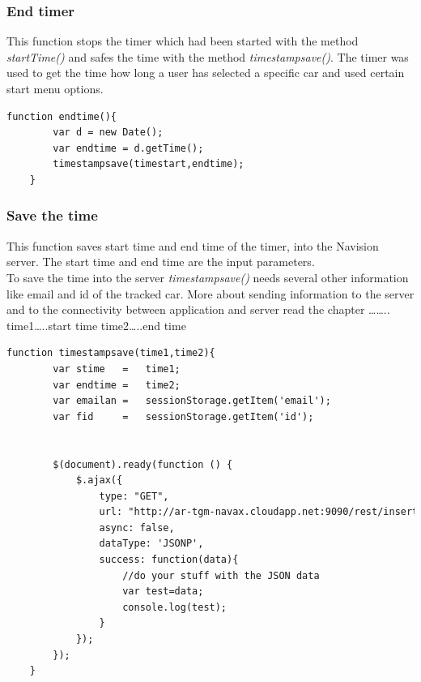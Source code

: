 \subsubsection{End timer}
This function stops the timer which had been started with the method \textit{startTime()} and safes the time with the method \textit{timestampsave()}. The timer was used to get the time how long a user has selected a specific car and used certain start menu options.
\\

\begin{lstlisting}[language=html, caption= 
End timer function,captionpos=b]
function endtime(){
        var d = new Date();
        var endtime = d.getTime();
        timestampsave(timestart,endtime);
    }
\end{lstlisting}


\subsubsection{Save the time}
This function saves start time and end time of the timer, into the Navision server. The start time and end time are the input parameters. 
\\


To save the time into the server \textit{timestampsave()} needs several other information like email and id of the tracked car. More about sending information to the server and  to the connectivity between application and server read the chapter …….. 
\\

time1…..start time
time2…..end time
\\

\begin{lstlisting}[language=html, caption= 
Save time function,captionpos=b]
function timestampsave(time1,time2){
        var stime	= 	time1;
        var endtime	=	time2;
        var emailan = 	sessionStorage.getItem('email');
        var fid 	= 	sessionStorage.getItem('id');
        

        $(document).ready(function () {
            $.ajax({
                type: "GET",
                url: "http://ar-tgm-navax.cloudapp.net:9090/rest/insertTrackingHistory/"+emailan+"/"+fid+"/"+stime+"/"+endtime+"/ac73f229f1fb88a8719e5f6d295bee45?callback=?",
                async: false,
                dataType: 'JSONP',
                success: function(data){
                    //do your stuff with the JSON data
                    var test=data;
                    console.log(test);
                }
            });
        });
    }
\end{lstlisting}


